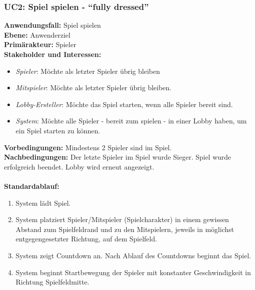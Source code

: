 \documentclass[11pt,ngerman]{article}
\newcommand{\quotes}[1]{``#1''}
\begin{document}
        \subsubsection{UC2: Spiel spielen - \quotes{fully dressed}}
            \begin{tcolorbox}[enhanced, breakable, sharp corners, width=\dimexpr\textwidth-15mm\relax ,enlarge left by=10mm ,fontupper=\linespread{1.1}\selectfont, boxrule=1pt, title={UC2: Spiel spielen}, colback=white, colframe=gray!22, coltitle=black]

                \textbf{Anwendungsfall:} Spiel spielen \\
                \textbf{Ebene:} Anwenderziel \\
                \textbf{Primärakteur:} Spieler \\
                \textbf{Stakeholder und Interessen:}
                \begin{itemize}
                    \item \textit{Spieler}: Möchte als letzter Spieler übrig bleiben
                    \item \textit{Mitspieler}: Möchte als letzter Spieler übrig bleiben.
                    \item \textit{Lobby-Ersteller}:  Möchte das Spiel starten, wenn alle Spieler bereit sind.
                    \item \textit{System}: Möchte alle Spieler - bereit zum spielen - in einer Lobby haben, um ein Spiel starten zu können.
                \end{itemize}
                \textbf{Vorbedingungen:} Mindestens 2 Spieler sind im Spiel.\\
                \textbf{Nachbedingungen:} Der letzte Spieler im Spiel wurde Sieger. Spiel wurde erfolgreich beendet. Lobby wird erneut angezeigt. \\
               \\  \textbf{Standardablauf:}
                \begin{enumerate}
                    \item System lädt Spiel.
                    \item System platziert Spieler/Mitspieler (Spielcharakter) in einem gewissen Abstand zum Spielfeldrand und zu den Mitspielern, jeweils in möglichst entgegengesetzter Richtung, auf dem Spielfeld.
                    \item System zeigt Countdown an. Nach Ablauf des Countdowns beginnt das Spiel.
                    \item System beginnt Startbewegung der Spieler mit konstanter Geschwindigkeit in Richtung Spielfeldmitte.

\end{enumerate}
\end{tcolorbox}
\end{document}
